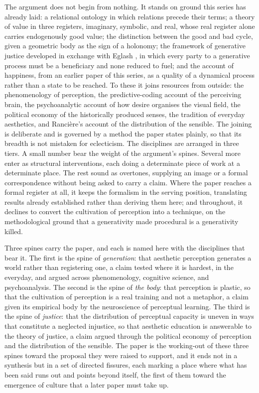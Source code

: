 The argument does not begin from nothing. It stands on ground this series has already laid: a relational ontology in which relations precede their terms; a theory of value in three registers, imaginary, symbolic, and real, whose real register alone carries endogenously good value; the distinction between the good and bad cycle, given a geometric body as the sign of a holonomy; the framework of generative justice developed in exchange with Eglash \parencite{eglash2016}, in which every party to a generative process must be a beneficiary and none reduced to fuel; and the account of happiness, from an earlier paper of this series, as a quality of a dynamical process rather than a state to be reached. To these it joins resources from outside: the phenomenology of perception, the predictive-coding account of the perceiving brain, the psychoanalytic account of how desire organises the visual field, the political economy of the historically produced senses, the tradition of everyday aesthetics, and Ranci\`ere's account of the distribution of the sensible. The joining is deliberate and is governed by a method the paper states plainly, so that its breadth is not mistaken for eclecticism. The disciplines are arranged in three tiers. A small number bear the weight of the argument's spines. Several more enter as structural interventions, each doing a determinate piece of work at a determinate place. The rest sound as overtones, supplying an image or a formal correspondence without being asked to carry a claim. Where the paper reaches a formal register at all, it keeps the formalism in the serving position, translating results already established rather than deriving them here; and throughout, it declines to convert the cultivation of perception into a technique, on the methodological ground that a generativity made procedural is a generativity killed.

Three spines carry the paper, and each is named here with the disciplines that bear it. The first is the spine of \emph{generation}: that aesthetic perception generates a world rather than registering one, a claim tested where it is hardest, in the everyday, and argued across phenomenology, cognitive science, and psychoanalysis. The second is the spine of \emph{the body}: that perception is plastic, so that the cultivation of perception is a real training and not a metaphor, a claim given its empirical body by the neuroscience of perceptual learning. The third is the spine of \emph{justice}: that the distribution of perceptual capacity is uneven in ways that constitute a neglected injustice, so that aesthetic education is answerable to the theory of justice, a claim argued through the political economy of perception and the distribution of the sensible. The paper is the working-out of these three spines toward the proposal they were raised to support, and it ends not in a synthesis but in a set of directed fissures, each marking a place where what has been said runs out and points beyond itself, the first of them toward the emergence of culture that a later paper must take up.
